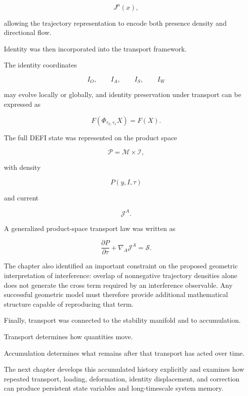 \documentclass[12pt,oneside]{book}
\begin{document}
\begin{equation}
    J^\mu(x),
\end{equation}

allowing the trajectory representation to encode both presence
density and directional flow.

Identity was then incorporated into the transport framework.

The identity coordinates

\begin{equation}
    I_O,
    \qquad
    I_A,
    \qquad
    I_S,
    \qquad
    I_W
\end{equation}

may evolve locally or globally, and identity preservation under
transport can be expressed as

\begin{equation}
    F
    \left(
        \Phi_{\tau_2,\tau_1}X
    \right)
    =
    F(X).
\end{equation}

The full DEFI state was represented on the product space

\begin{equation}
    \mathcal{P}
    =
    \mathcal{M}
    \times
    \mathcal{I},
\end{equation}

with density

\begin{equation}
    P(y,I,\tau)
\end{equation}

and current

\begin{equation}
    \mathcal{J}^A.
\end{equation}

A generalized product-space transport law was written as

\begin{equation}
    \frac{\partial P}{\partial\tau}
    +
    \nabla_A\mathcal{J}^A
    =
    \mathcal{S}.
\end{equation}

The chapter also identified an important constraint on the
proposed geometric interpretation of interference: overlap of
nonnegative trajectory densities alone does not generate the
cross term required by an interference observable. Any
successful geometric model must therefore provide additional
mathematical structure capable of reproducing that term.

Finally, transport was connected to the stability manifold and
to accumulation.

Transport determines how quantities move.

Accumulation determines what remains after that transport has
acted over time.

The next chapter develops this accumulated history explicitly
and examines how repeated transport, loading, deformation,
identity displacement, and correction can produce persistent
state variables and long-timescale system memory.
\end{document}
